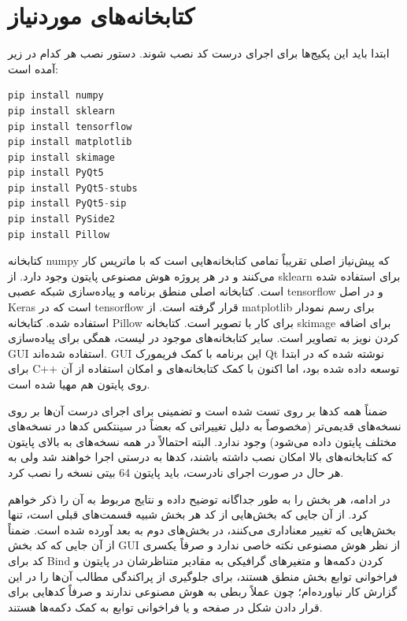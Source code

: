 \documentclass[12pt,titlepage,a4page , tikz , multi,table , svgnames,xcdraw]{article}
\begin{document}
\tableofcontents


\newpage





\newpage

\section{کتابخانه‌های موردنیاز}

ابتدا باید این پکیج‌ها برای اجرای درست کد نصب شوند. دستور نصب هر کدام در زیر آمده است:

\begin{latin}
\begin{lstlisting}[language=Python]
pip install numpy
pip install sklearn
pip install tensorflow
pip install matplotlib
pip install skimage
pip install PyQt5
pip install PyQt5-stubs
pip install PyQt5-sip
pip install PySide2
pip install Pillow

\end{lstlisting}

\end{latin}
کتابخانه numpy که پیش‌نیاز اصلی تقریباً تمامی کتابخانه‌هایی است که با ماتریس کار می‌کنند و در هر پروژه هوش مصنوعی پایتون وجود دارد. از sklearn برای  استفاده شده است. کتابخانه اصلی منطق برنامه و پیاده‌سازی شبکه عصبی tensorflow و در اصل Keras است که در tensorflow قرار گرفته است. از matplotlib برای رسم نمودار استفاده شده. کتابخانه Pillow برای کار با تصویر است. کتابخانه skimage برای اضافه کردن نویز به تصاویر است. سایر کتابخانه‌های موجود در لیست، همگی برای پیاده‌سازی GUI استفاده شده‌اند. GUI این برنامه با کمک فریمورک Qt نوشته شده که در ابتدا برای C++ توسعه داده شده بود، اما اکنون با کمک کتابخانه‌های  و  امکان استفاده از آن روی پایتون هم مهیا شده است.


ضمناً همه کدها بر روی  تست شده است و تضمینی برای اجرای درست آن‌ها بر روی نسخه‌های قدیمی‌تر (مخصوصاً به دلیل تغییراتی که بعضاً در سینتکس کدها در نسخه‌های مختلف پایتون داده می‌شود) وجود ندارد. البته احتمالاً در همه نسخه‌های  به بالای پایتون که کتابخانه‌های بالا امکان نصب داشته باشند، کدها به درستی اجرا خواهند شد ولی به هر حال در صورت اجرای نادرست، باید پایتون 64 بیتی نسخه  را نصب کرد.



در ادامه، هر بخش را به طور جداگانه توضیح داده و نتایج مربوط به آن را ذکر خواهم کرد. از آن جایی که بخش‌هایی از کد هر بخش شبیه قسمت‌های قبلی است، تنها بخش‌هایی که تغییر معناداری می‌کنند، در بخش‌های دوم به بعد آورده شده است. ضمناً از آن جایی که کد بخش GUI از نظر هوش مصنوعی نکته خاصی ندارد و صرفاً یکسری کد برای Bind کردن دکمه‌ها و متغیرهای گرافیکی به مقادیر متناظرشان در پایتون و فراخوانی توابع بخش منطق هستند، برای جلوگیری از پراکندگی مطالب آن‌ها را در این گزارش کار نیاورده‌ام؛ چون عملاً ربطی به هوش مصنوعی ندارند و صرفاً کدهایی برای قرار دادن شکل در صفحه و یا فراخوانی توابع به کمک دکمه‌ها هستند.
\end{document}
